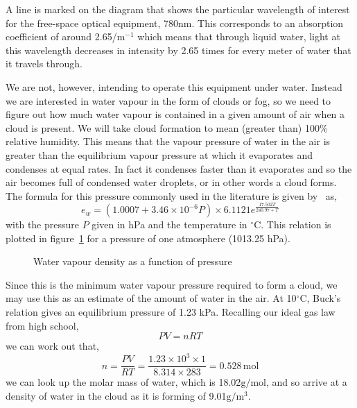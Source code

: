 A line is marked on the diagram that shows the particular wavelength
of interest for the free-space optical equipment, 780nm. This
corresponds to an absorption coefficient of around 2.65/m$^{-1}$ which
means that through liquid water, light at this wavelength decreases in
intensity by 2.65 times for every meter of water that it travels
through.

We are not, however, intending to operate this equipment under
water. Instead we are interested in water vapour in the form of clouds
or fog, so we need to figure out how much water vapour is contained
in a given amount of air when a cloud is present. We will take cloud
formation to mean (greater than) 100\% relative humidity. This means
that the vapour pressure of water in the air is greater than the
equilibrium vapour pressure at which it evaporates and condenses at
equal rates. In fact it condenses faster than it evaporates and so the
air becomes full of condensed water droplets, or in other words a
cloud forms. The formula for this pressure commonly used in the
literature is given by~\cite{buck_new_1981} as,
\begin{equation}
  \label{eq:buck}
  e_w = (1.0007 + 3.46\times 10^{-6}P)\times 6.1121e^{\frac{17.502T}{240.97+T}}
\end{equation}
with the pressure $P$ given in hPa and the temperature in
$^\circ$C. This relation is plotted in figure~\ref{fig:water-pressure}
for a pressure of one atmosphere (1013.25 hPa).
\begin{figure}[h]
  \centering
  \caption{Water vapour density as a function of pressure}
  \label{fig:water-pressure}
\end{figure}

Since this is the minimum water vapour pressure required to form a
cloud, we may use this as an estimate of the amount of water in the
air. At 10$^\circ$C, Buck's relation gives an equilibrium pressure of
1.23 kPa. Recalling our ideal gas law from high school,
\begin{equation}
  \label{eq:ideal-gas}
  PV = nRT
\end{equation}
we can work out that,
\begin{equation*}
  n = \frac{PV}{RT} 
    = \frac{1.23\times 10^3 \times 1}
           {8.314 \times 283}
    = 0.528\, \text{mol}
\end{equation*}
we can look up the molar mass of water, which is
18.02$\text{g}/\text{mol}$, and so arrive at a density of water in the
cloud as it is forming of 9.01$\text{g}/\text{m}^3$.

